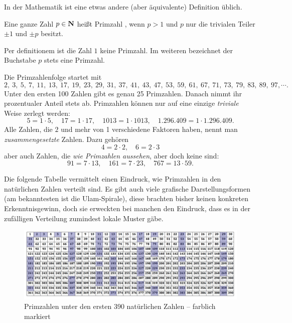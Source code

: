 \begin{refsegment}
In der Mathematik ist eine etwas andere (aber äquivalente) Definition üblich.

\begin{definition}\label{def-pz-prime}
Eine ganze Zahl $p \in {\bf N}$ heißt Primzahl , wenn $p > 1$ und $p$ nur die trivialen
Teiler $\pm 1$ und $\pm p$ besitzt.
\end{definition}


Per definitionem ist die Zahl $1$ keine Primzahl. Im weiteren bezeichnet der Buchstabe $p$ stets eine Primzahl.

Die Primzahlenfolge startet mit
$$ 2,~ 3,~ 5,~ 7, ~ 11, ~ 13, ~ 17, ~ 19, ~ 23, ~ 29, ~ 31, ~ 37, ~ 41, ~ 43, ~ 47, ~ 53, ~ 59, ~ 61, ~ 67, ~ 71, ~ 73, ~ 79, ~ 83, ~ 89, ~ 97, \cdots .$$
Unter den ersten 100 Zahlen gibt es genau 25 Primzahlen. Danach nimmt ihr prozentualer Anteil stets
ab. Primzahlen können nur auf eine einzige {\em triviale} Weise zerlegt werden:
$$5 = 1 \cdot 5,\quad  17 = 1 \cdot 17, \quad 1013 = 1 \cdot 1013,  \quad 1.296.409 = 1 \cdot 1.296.409.$$
Alle Zahlen, die $2$ und mehr von 1 verschiedene Faktoren haben, nennt man  {\em zusammengesetzte} Zahlen. Dazu gehören
$$ 4 = 2 \cdot 2, \quad 6 = 2\cdot 3 $$
aber auch Zahlen, die {\em wie Primzahlen aussehen}, aber doch keine sind:
$$ 91 = 7 \cdot 13, \quad 161=7 \cdot 23, \quad 767 =13 \cdot 59. $$


\newpage
Die folgende Tabelle vermittelt einen Eindruck, wie Primzahlen in den natürlichen Zahlen verteilt sind. Es gibt auch viele grafische Darstellungsformen (am bekanntesten ist die Ulam-Spirale), diese brachten bisher keinen konkreten Erkenntnisgewinn, doch sie erweckten bei manchen den Eindruck, dass es in der zufälligen Verteilung zumindest lokale Muster gäbe.

\begin{figure}[!hb]
\begin{center}
\includegraphics[scale=0.3]{figures/Numberrectangle-with-colored-primes_Irisprime.jpg}
\caption[Primzahlen unter den ersten 390 natürlichen Zahlen -- farblich markiert]
        {Primzahlen unter den ersten 390 natürlichen Zahlen -- farblich markiert\protect\footnotemark}
\label{Primes-in-a-390-integer-rechtangle-figure}
\end{center}
\end{figure}


\end{refsegment}
